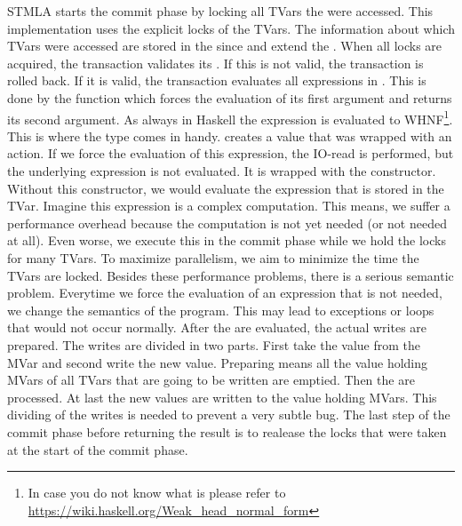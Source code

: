 STMLA starts the commit phase by locking all TVars the were accessed. This implementation 
uses the explicit locks of the TVars. The information about which TVars were accessed are 
stored in the  since  and  extend 
the .
When all locks are acquired, the transaction validates its .
If this is not valid, the transaction is rolled back.
If it is valid, the transaction evaluates all expressions in . This is done
by the  function which forces the evaluation of its first argument and returns 
its second argument. As always in Haskell the expression is evaluated to WHNF\footnote{In 
case you do not know what  is please refer to 
\url{https://wiki.haskell.org/Weak_head_normal_form}}. This is where the  type 
comes in handy.  creates a  value that was wrapped with an
 action. If we force the evaluation of this expression, the 
IO-read is performed, but the underlying expression is not evaluated. It is wrapped 
with the  constructor. Without this constructor, we would evaluate the expression that 
is stored in the TVar. Imagine this expression is a complex computation. This means, we 
suffer a performance overhead because the computation is not yet needed (or not needed at all). 
Even worse, we execute this in the commit phase while we hold the locks for many TVars.
To maximize parallelism, we aim to minimize the time the TVars are locked. Besides these
performance problems, there is a serious semantic problem. Everytime we force the 
evaluation of an expression that is not needed, we change the semantics of the program.
This may lead to exceptions or loops that would not occur normally.
After the  are evaluated, the actual writes are prepared. The writes are 
divided in two parts. First take the value from the MVar and second write the new value.
Preparing means all the value holding MVars of all TVars that are going to be written
are emptied. Then the  are processed. At last the new values are written
to the value holding MVars. This dividing of the writes is needed to prevent a very subtle bug. 
The last step of the commit phase before returning the result is to realease the locks
that were taken at the start of the commit phase.

